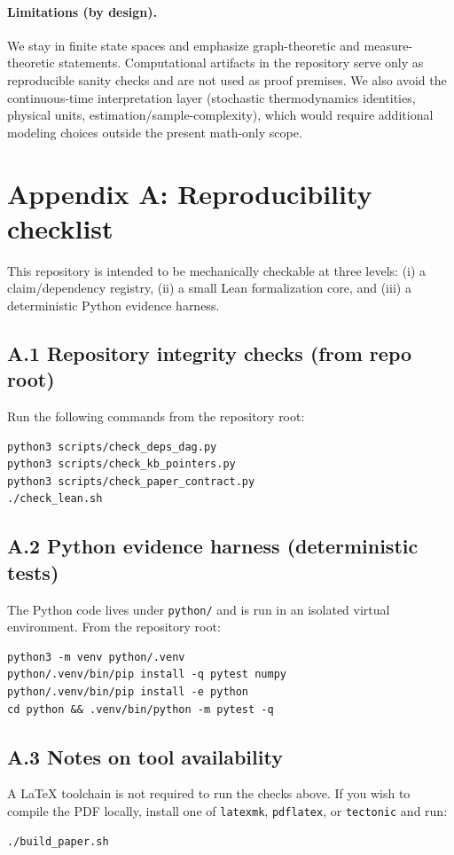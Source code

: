 \documentclass[11pt]{article}
\theoremstyle{remark}
\begin{document}
\paragraph{Limitations (by design).}
We stay in finite state spaces and emphasize graph-theoretic and measure-theoretic statements.
Computational artifacts in the repository serve only as reproducible sanity checks and are not used as proof premises.
We also avoid the continuous-time interpretation layer (stochastic thermodynamics identities, physical units, estimation/sample-complexity), which would require additional modeling choices outside the present math-only scope.

\appendix

\section{Appendix A: Reproducibility checklist}
This repository is intended to be mechanically checkable at three levels:
(i) a claim/dependency registry, (ii) a small Lean formalization core, and
(iii) a deterministic Python evidence harness.

\subsection*{A.1 Repository integrity checks (from repo root)}
Run the following commands from the repository root:
\begin{verbatim}
python3 scripts/check_deps_dag.py
python3 scripts/check_kb_pointers.py
python3 scripts/check_paper_contract.py
./check_lean.sh
\end{verbatim}

\subsection*{A.2 Python evidence harness (deterministic tests)}
The Python code lives under \texttt{python/} and is run in an isolated virtual environment.
From the repository root:
\begin{verbatim}
python3 -m venv python/.venv
python/.venv/bin/pip install -q pytest numpy
python/.venv/bin/pip install -e python
cd python && .venv/bin/python -m pytest -q
\end{verbatim}

\subsection*{A.3 Notes on tool availability}
A \LaTeX{} toolchain is not required to run the checks above.
If you wish to compile the PDF locally, install one of \texttt{latexmk}, \texttt{pdflatex}, or \texttt{tectonic} and run:
\begin{verbatim}
./build_paper.sh
\end{verbatim}
\end{document}
